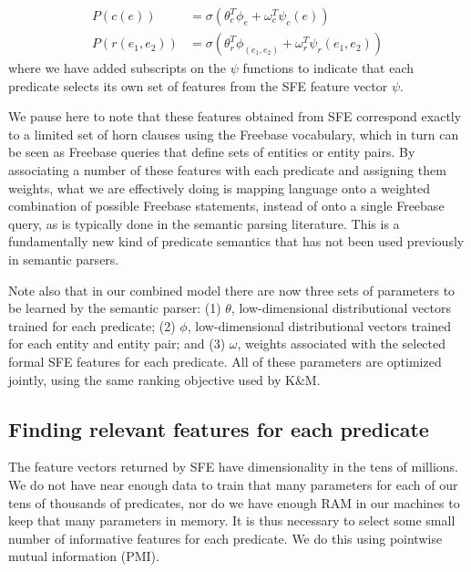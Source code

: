 \documentclass[11pt]{article}
\begin{document}
\begin{align*}
  P(c(e)) &= \sigma ( \theta_c^T \phi_e + \omega_c^T \psi_c(e)) \\
  P(r(e_1, e_2)) &= \sigma ( \theta_r^T \phi_{(e_1, e_2)} + \omega_r^T \psi_r(e_1, e_2) )
\end{align*}
where we have added subscripts on the $\psi$ functions to indicate that each
predicate selects its own set of features from the SFE feature vector $\psi$.

We pause here to note that these features obtained from SFE correspond exactly
to a limited set of horn clauses using the Freebase vocabulary, which in turn
can be seen as Freebase queries that define sets of entities or entity pairs.
By associating a number of these features with each predicate and assigning
them weights, what we are effectively doing is mapping language onto a weighted
combination of possible Freebase statements, instead of onto a single Freebase
query, as is typically done in the semantic parsing literature.  This is a
fundamentally new kind of predicate semantics that has not been used previously
in semantic parsers.

Note also that in our combined model there are now three sets of parameters to
be learned by the semantic parser: (1) $\theta$, low-dimensional distributional
vectors trained for each predicate; (2) $\phi$, low-dimensional distributional
vectors trained for each entity and entity pair; and (3) $\omega$, weights
associated with the selected formal SFE features for each predicate.  All of
these parameters are optimized jointly, using the same ranking objective used
by K\&M.

\subsection{Finding relevant features for each predicate}
\label{sec:computing-pmi}

The feature vectors returned by SFE have dimensionality in the tens of
millions.  We do not have near enough data to train that many parameters for
each of our tens of thousands of predicates, nor do we have enough RAM in our
machines to keep that many parameters in memory.  It is thus necessary to
select some small number of informative features for each predicate.  We do
this using pointwise mutual information (PMI).
\end{document}
